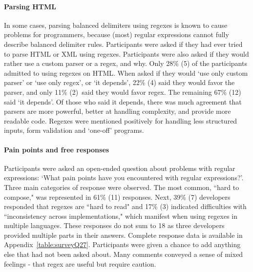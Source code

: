 \paragraph{Parsing HTML}\label{sec:surveyParsingHTML}   In some cases, parsing balanced delimiters using regexes is known to cause problems for programmers, because (most) regular expressions cannot fully describe balanced delimiter rules. Participants were asked if they had ever tried to parse HTML or XML using regexes.  Participants were also asked if they would rather use a custom parser or a regex, and why.  Only 28\% (5) of the participants admitted to using regexes on HTML.  When asked if they would `use only custom parser' or `use only regex', or `it depends', 22\% (4) said they would favor the parser, and only 11\% (2) said they would favor regex.  The remaining 67\% (12) said `it depends'.  Of those who said it depends, there was much agreement that parsers are more powerful, better at handling complexity, and provide more readable code.  Regexes were mentioned positively for handling less structured inputs, form validation and `one-off' programs.

\paragraph{Pain points and free responses}\label{sec:painPoints}
Participants were asked an open-ended question about problems with regular expressions: `What pain points have you encountered with regular expressions?'.  Three main categories of response were observed. The most common, ``hard to compose," was represented in 61\% (11) responses. Next, 39\% (7) developers responded that regexes are ``hard to read" and 17\% (3) indicated difficulties with ``inconsistency across implementations," which manifest when using regexes in multiple languages. These responses do not sum to 18 as three developers provided multiple parts in their answers.  Complete response data is available in Appendix~\ref{table:surveyQ27}.  Participants were given a chance to add anything else that had not been asked about.  Many comments conveyed a sense of mixed feelings - that regex are useful but require caution.

